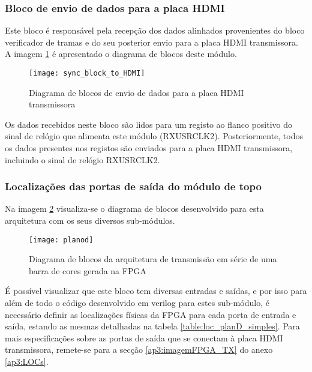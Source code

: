 \subsubsection*{Bloco de envio de dados para a placa HDMI} \label{subsub:serial_send signals to HDMI}

Este bloco é responsável pela recepção dos dados alinhados provenientes do bloco verificador de tramas e do seu posterior envio para a placa HDMI transmissora. A imagem \ref{fig:sync_block_to_HDMI} é apresentado o diagrama de blocos deste módulo.

\begin{figure}[h!]
	\begin{center}
		\leavevmode
		\texttt{[image: sync\_block\_to\_HDMI]}
		\captionsetup{width=1.0\linewidth}
		\caption[Diagrama de blocos de envio de dados para a placa HDMI transmissora]{Diagrama de blocos de envio de dados para a placa HDMI transmissora}
		\label{fig:sync_block_to_HDMI}
	\end{center}
\end{figure}

Os dados recebidos neste bloco são lidos para um registo ao flanco positivo do sinal de relógio que alimenta este módulo (RXUSRCLK2). Posteriormente, todos os dados presentes nos registos são enviados para a placa HDMI transmissora, incluindo o sinal de relógio RXUSRCLK2.

\subsubsection*{Localizações das portas de saída do módulo de topo} \label{subsub:serial_locs_planD}

Na imagem \ref{fig:planD} visualiza-se o diagrama de blocos desenvolvido para esta arquitetura com os seus diversos sub-módulos. 
\begin{figure}[h!]
	\begin{center}
		\leavevmode
		\texttt{[image: planod]}
		\captionsetup{width=1.0\linewidth}
		\caption[Diagrama de blocos da arquitetura de transmissão em série de uma barra de cores gerada na FPGA]{Diagrama de blocos da arquitetura de transmissão em série de uma barra de cores gerada na FPGA}
		\label{fig:planD}
	\end{center}
\end{figure}

É possível visualizar que este bloco tem diversas entradas e saídas, e por isso para além de todo o código desenvolvido em verilog para estes sub-módulo, é necessário definir as localizações físicas da FPGA para cada porta de entrada e saída, estando as mesmas detalhadas na  tabela \ref{table:loc_planD_simples}. Para mais especificações sobre as portas de saída que se conectam à placa HDMI transmissora, remete-se para a secção \ref{ap3:imagemFPGA_TX} do anexo \ref{ap3:LOCs}.

